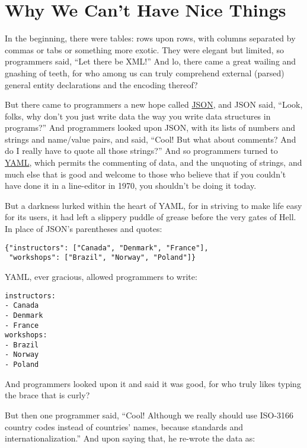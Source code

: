\chapter{Why We Can't Have Nice Things}\label{norway}

In the beginning, there were tables:
rows upon rows,
with columns separated by commas or tabs or something more exotic.
They were elegant but limited,
so programmers said,
``Let there be XML!''
And lo,
there came a great wailing and gnashing of teeth,
for who among us can truly comprehend external (parsed) general entity declarations
and the encoding thereof?

But there came to programmers a new hope called \href{https://en.wikipedia.org/wiki/JSON}{JSON},
and JSON said,
``Look, folks, why don't you just write data the way you write data structures in programs?''
And programmers looked upon JSON,
with its lists of numbers and strings and name/value pairs,
and said,
``Cool!  But what about comments?  And do I really have to quote all those strings?''
And so programmers turned to \href{https://en.wikipedia.org/wiki/YAML}{YAML},
which permits the commenting of data,
and the unquoting of strings,
and much else that is good and welcome to those who believe that
if you couldn't have done it in a line-editor in 1970,
you shouldn't be doing it today.

But a darkness lurked within the heart of YAML,
for in striving to make life easy for its users,
it had left a slippery puddle of grease before the very gates of Hell.
In place of JSON's parentheses and quotes:

\begin{lstlisting}
{"instructors": ["Canada", "Denmark", "France"],
 "workshops": ["Brazil", "Norway", "Poland"]}
\end{lstlisting}

\noindent
YAML, ever gracious, allowed programmers to write:

\begin{lstlisting}
instructors:
- Canada
- Denmark
- France
workshops:
- Brazil
- Norway
- Poland
\end{lstlisting}

\noindent
And programmers looked upon it and said it was good,
for who truly likes typing the brace that is curly?

But then one programmer said,
``Cool!
Although we really should use ISO-3166 country codes instead of countries' names,
because standards and internationalization.''
And upon saying that,
he re-wrote the data as:

